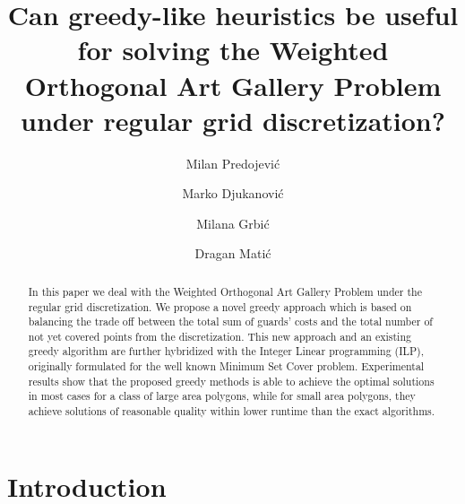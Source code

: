 \documentclass[runningheads,a4paper]{elsarticle}
\begin{document}
	
	
	\title{Can greedy-like heuristics be useful for solving the Weighted Orthogonal Art Gallery Problem under regular grid discretization?}
	
	\author[1]{Milan Predojevi\'c}
\author[1]{Marko Djukanovi\'c}
\author[1]{Milana Grbi\'c}
\author[1]{Dragan Mati\'c}
    \address[1]{Faculty of Natural Science and Mathematics, University of Banja Luka, Bosnia and Herzegovina}

	\begin{abstract}
		In this paper we deal with the Weighted Orthogonal Art Gallery Problem under the regular grid discretization. We propose a novel greedy approach which is based on balancing the trade off between the total sum of guards' costs and the total number of not yet covered points from the discretization. This new approach and an existing greedy algorithm are further  hybridized with the Integer Linear programming (ILP), originally formulated for the well known Minimum Set Cover problem. Experimental results show that the proposed greedy methods is able to achieve the optimal solutions in most cases for a class of large area polygons, while for small area polygons, they achieve solutions of reasonable quality within lower runtime than the exact algorithms.
	\end{abstract}
	\maketitle
	
	
	\section{Introduction}\label{sec:introduction}
	
\end{document}
